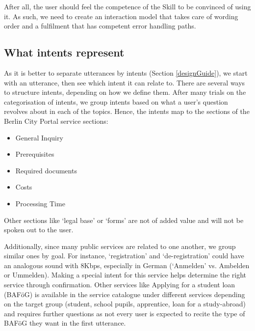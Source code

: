 




After all, the user should feel the competence of the Skill to be convinced of using it. %
As such, we need to create an interaction model that takes care of wording order and a fulfilment that has competent error handling paths. 

\subsection*{What intents represent}
 As it is better to separate utterances by intents (Section \ref{designGuide}), we start with an utterance, then see which intent it can relate to. 
 There are several ways to structure intents, depending on how we define them. After many trials on the categorisation of intents, we group intents based on what a user's question revolves about in each of the topics. Hence, the intents map to the sections of the Berlin City Portal service sections:
 \begin{itemize}
 	\itemsep0em
\item General Inquiry
\item Prerequisites
\item Required documents
\item Costs
\item Processing Time
 \end{itemize}
 
 Other sections like `legal base' or `forms' are not of added value and will not be spoken out to the user.
 
 Additionally, since many public services are related to one another, we group similar ones by goal. For instance, `registration' and `de-registration' could have an analogous sound with 8Kbps, especially in German (`Anmelden' vs. Ambelden or Ummelden). Making a special intent for this service helps determine the right service through confirmation. Other services like Applying for a student loan (BAFöG) is available in the service catalogue under different services depending on the target group (student, school pupils, apprentice, loan for a study-abroad) and requires further questions as not every user is expected to recite the type of BAFöG they want in the first utterance.



